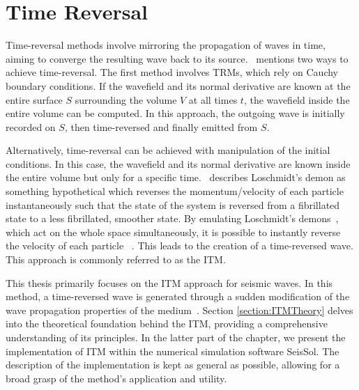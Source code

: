\chapter{Time Reversal}\label{chapter:TimeReversal}

Time-reversal methods involve mirroring the propagation of waves in time, aiming to converge the resulting wave back to its source.~\parencite{Fink2017} mentions two ways to achieve time-reversal.
The first method involves \ac{TRM}s, which rely on Cauchy boundary conditions. If the wavefield and its normal derivative are known at the entire surface $S$ surrounding the volume
$V$ at all times $t$, the wavefield inside the entire volume can be computed. In this approach, the outgoing wave is initially 
recorded on $S$, then time-reversed and finally emitted from $S$. 

\par Alternatively, time-reversal can be achieved with manipulation of the initial conditions. In this case, the wavefield and its normal derivative
are known inside the entire volume but only for a specific time.~\parencite{Weinert2016} describes Loschmidt's demon as something hypothetical which reverses the momentum/velocity of each particle instantaneously such that the state of the system is reversed 
from a fibrillated state to a less fibrillated, smoother state.
By emulating Loschmidt's demons~\parencite{Weinert2016},  which act on the whole space simultaneously, it is possible to instantly reverse
the velocity of each particle ~\parencite{Fink2017}. This leads to the creation of a time-reversed wave. This approach is commonly referred to as the \acf{ITM}.

\par This thesis primarily focuses on the \ac{ITM} approach for seismic waves. In this method, a time-reversed wave is generated through a sudden modification of the wave propagation
properties of the medium~\parencite{Bacot2016}. Section \ref{section:ITMTheory} delves into the theoretical foundation behind the \ac{ITM}, providing a comprehensive
understanding of its principles. In the latter part of the chapter, we present the implementation of \ac{ITM} within the numerical simulation software SeisSol. The
description of the implementation is kept as general as possible, allowing for a broad grasp of the method's application and utility.


